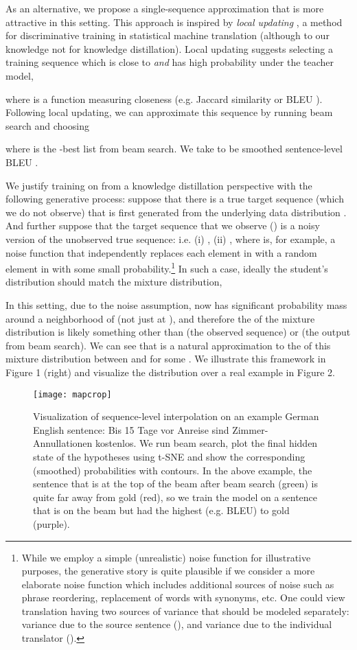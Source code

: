 \documentclass[11pt,letterpaper]{article}
\begin{document}
As an alternative, we propose a single-sequence approximation that
is more attractive in this setting. This approach is inspired by
\textit{local updating} \cite{Liang2006}, a method
 for discriminative training in statistical
machine translation (although to our knowledge not for knowledge
distillation). Local updating suggests selecting a training sequence which is
close to  \textit{and} has high probability under the teacher
model,

where  is a function measuring closeness (e.g. Jaccard
similarity or  BLEU \cite{Papineni2002}). Following local updating, we can approximate this 
sequence by running beam search and choosing

where  is the -best list from beam search. We take  to be smoothed
sentence-level BLEU \cite{Chen2014}.

We justify training on  from a knowledge distillation perspective with the following
generative process: suppose that there is a true target sequence (which we do not observe) that
is first generated from the underlying data distribution  . And further suppose 
that the target sequence that we observe () is a noisy version of the unobserved true sequence: i.e. 
(i) , (ii) , 
where   is, for example, a noise function that independently
replaces each element in  with 
a random element in  with some small probability.\footnote{While we employ a simple
  (unrealistic) noise function 
for illustrative purposes, the generative story is quite plausible if we consider a more
elaborate noise function which includes additional sources of noise such as phrase reordering,
replacement of words with synonyms, etc. 
One could view translation having two sources of variance that should be modeled separately: 
variance due to the source sentence (), and 
variance due to the individual translator ().}
In such a case, ideally the student's
distribution should match the mixture distribution, 


In this setting, due to the noise assumption,  now has significant probability mass around
a neighborhood of  (not just at ), and therefore the
 of the  mixture distribution is likely something other
than  (the observed sequence) or  (the output from beam search). 
We can see that 
 is a natural approximation to the  of this
mixture distribution between  and 
for some . We illustrate this framework in Figure 1 (right) and visualize the distribution
over a real example in Figure 2.

\begin{figure}[t]\label{fig2}
\centering
\texttt{[image: mapcrop]}
\caption{Visualization of sequence-level interpolation on an example 
German  English sentence:
\textsf{Bis 15 Tage vor Anreise sind Zimmer-Annullationen kostenlos}.
We run beam search, plot the final hidden state
of the hypotheses using t-SNE and show the corresponding (smoothed)
probabilities with contours. 
In the above example, the sentence that is at the top of the beam after beam search 
(green) is quite far away from gold (red), so we train the model on a sentence
that is on the beam but had the highest  (e.g. BLEU) to gold (purple).}
\end{figure}
\end{document}
